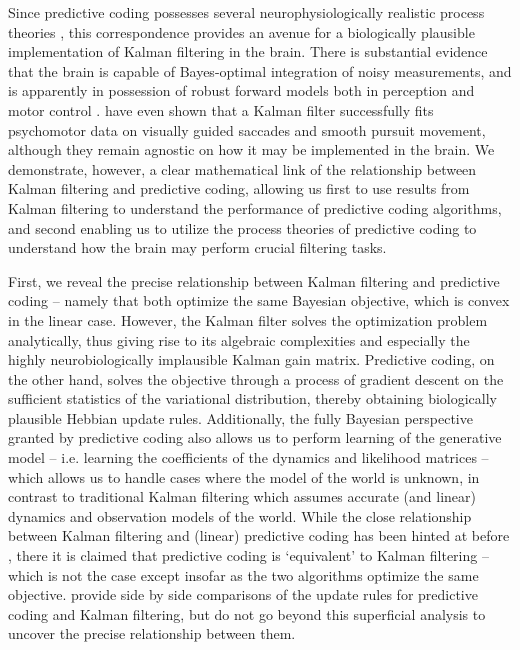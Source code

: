 Since predictive coding possesses several neurophysiologically realistic process theories \citep{bastos2012canonical}, this correspondence provides an avenue for a biologically plausible implementation of Kalman filtering in the brain. There is substantial evidence that the brain is capable of Bayes-optimal integration of noisy measurements, and is apparently in possession of robust forward models both in perception \citep*{zago2008internal,simoncelli2009optimal} and motor control \citep*{munuera2009optimal, gold2003influence,todorov2004optimality}. \citet*{de2013Kalman} have even shown that a Kalman filter successfully fits psychomotor data on visually guided saccades and smooth pursuit movement, although they remain agnostic on how it may be implemented in the brain. We demonstrate, however, a clear mathematical link of the relationship between Kalman filtering and predictive coding, allowing us first to use results from Kalman filtering to understand the performance of predictive coding algorithms, and second enabling us to utilize the process theories of predictive coding to understand how the brain may perform crucial filtering tasks.

First, we reveal the precise relationship between Kalman filtering and predictive coding -- namely that both optimize the same Bayesian objective, which is convex in the linear case. However, the Kalman filter solves the optimization problem analytically, thus giving rise to its algebraic complexities and especially the highly neurobiologically implausible Kalman gain matrix. Predictive coding, on the other hand, solves the objective through a process of gradient descent on the sufficient statistics of the variational distribution, thereby obtaining biologically plausible Hebbian update rules. Additionally, the fully Bayesian perspective granted by predictive coding also allows us to perform learning of the generative model -- i.e. learning the coefficients of the dynamics and likelihood matrices -- which allows us to handle cases where the model of the world is unknown, in contrast to traditional Kalman filtering which assumes accurate (and linear) dynamics and observation models of the world. While the close relationship between Kalman filtering and (linear) predictive coding has been hinted at before \citep{friston2005theory,friston2008hierarchical}, there it is claimed that predictive coding is `equivalent' to Kalman filtering -- which is not the case except insofar as the two algorithms optimize the same objective. \citet{baltieri2020Kalman} provide side by side comparisons of the update rules for predictive coding and Kalman filtering, but do not go beyond this superficial analysis to uncover the precise relationship between them. 

